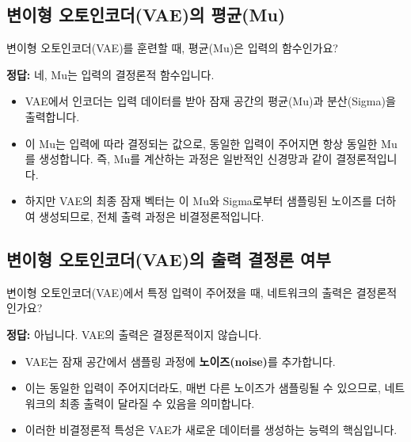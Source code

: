 \documentclass[11pt,a4paper]{article}
\begin{document}
\subsection{변이형 오토인코더(VAE)의 평균(Mu)}
\begin{conceptbox}[title={질문 4: VAE의 평균(Mu)은 입력의 함수인가?}]
변이형 오토인코더(VAE)를 훈련할 때, 평균(Mu)은 입력의 함수인가요?
\end{conceptbox}

\begin{summarybox}[title={정답 및 설명}]
\textbf{정답:} 네, Mu는 입력의 결정론적 함수입니다.
\begin{itemize}
    \item VAE에서 인코더는 입력 데이터를 받아 잠재 공간의 평균(Mu)과 분산(Sigma)을 출력합니다.
    \item 이 Mu는 입력에 따라 결정되는 값으로, 동일한 입력이 주어지면 항상 동일한 Mu를 생성합니다. 즉, Mu를 계산하는 과정은 일반적인 신경망과 같이 결정론적입니다.
    \item 하지만 VAE의 최종 잠재 벡터는 이 Mu와 Sigma로부터 샘플링된 노이즈를 더하여 생성되므로, 전체 출력 과정은 비결정론적입니다.
\end{itemize}
\end{summarybox}

\subsection{변이형 오토인코더(VAE)의 출력 결정론 여부}
\begin{conceptbox}[title={질문 5: VAE의 출력 결정론 여부}]
변이형 오토인코더(VAE)에서 특정 입력이 주어졌을 때, 네트워크의 출력은 결정론적인가요?
\end{conceptbox}

\begin{summarybox}[title={정답 및 설명}]
\textbf{정답:} 아닙니다. VAE의 출력은 결정론적이지 않습니다.
\begin{itemize}
    \item VAE는 잠재 공간에서 샘플링 과정에 \textbf{노이즈(noise)}를 추가합니다.
    \item 이는 동일한 입력이 주어지더라도, 매번 다른 노이즈가 샘플링될 수 있으므로, 네트워크의 최종 출력이 달라질 수 있음을 의미합니다.
    \item 이러한 비결정론적 특성은 VAE가 새로운 데이터를 생성하는 능력의 핵심입니다.
\end{itemize}
\end{summarybox}
\end{document}
